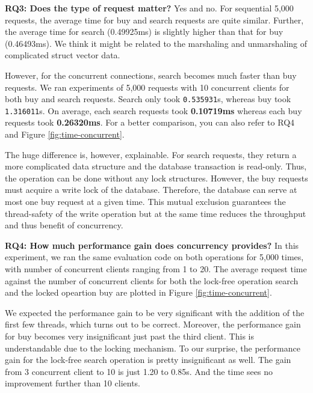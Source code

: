 \documentclass[letterpaper,11pt,twocolumn]{article}
\begin{document}


\textbf{RQ3: Does the type of request matter?}
Yes and no. For sequential 5,000 requests, the average time for buy and search requests are quite similar. Further, the average time for search (0.49925ms) is slightly higher than that for buy (0.46493ms). We think it might be related to the marshaling and unmarshaling of complicated struct vector data.

However, for the concurrent connections, search becomes much faster than buy requests. We ran experiments of 5,000 requests with 10 concurrent clients for both buy and search requests. Search only took \texttt{0.535931}s, whereas buy took \texttt{1.316011}s. On average, each search requests took \textbf{0.10719ms} whereas each buy requests took \textbf{0.26320ms}. For a better comparison, you can also refer to RQ4 and Figure \ref{fig:time-concurrent}.

The huge difference is, however, explainable. For search requests, they return a more complicated data structure and the database transaction is read-only. Thus, the operation can be done without any lock structures. However, the buy requests must acquire a write lock of the database. Therefore, the database can serve at most one buy request at a given time. This mutual exclusion guarantees the thread-safety of the write operation but at the same time reduces the throughput and thus benefit of concurrency.

\textbf{RQ4: How much performance gain does concurrency provides?}
In this experiment, we ran the same evaluation code on both operations for 5,000 times, with number of concurrent clients ranging from 1 to 20.
The average request time against the number of concurrent clients for both the lock-free operation search and the locked opeartion buy are plotted in Figure \ref{fig:time-concurrent}. 

We expected the performance gain to be very significant with the addition of the first few threads, which turns out to be correct. Moreover, the performance gain for buy becomes very insignificant just past the third client. This is understandable due to the locking mechanism.
To our surprise, the performance gain for the lock-free search operation is pretty insignificant as well. The gain from 3 concurrent client to 10 is just 1.20 to 0.85s. And the time sees no improvement further than 10 clients.
\end{document}
